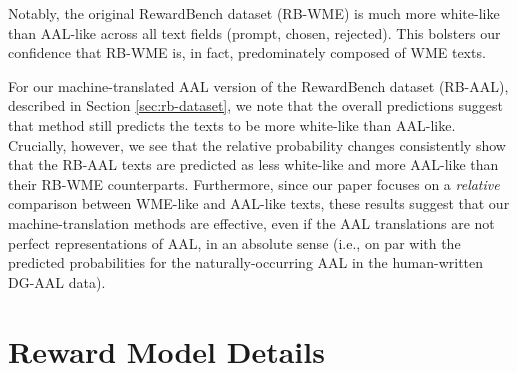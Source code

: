 Notably, the original RewardBench dataset (\textsc{RB-WME}) is much more white-like than AAL-like across all text fields (prompt, chosen, rejected). This bolsters our confidence that \textsc{RB-WME} is, in fact, predominately composed of WME texts.

For our machine-translated AAL version of the RewardBench dataset (\textsc{RB-AAL}), described in Section \ref{sec:rb-dataset}, we note that the overall predictions suggest that  method still predicts the texts to be more white-like than AAL-like. Crucially, however, we see that the relative probability changes consistently show that the \textsc{RB-AAL} texts are predicted as less white-like and more AAL-like than their \textsc{RB-WME} counterparts. Furthermore, since our paper focuses on a \textit{relative} comparison between WME-like and AAL-like texts, these results suggest that our machine-translation methods are effective, even if the AAL translations are not perfect representations of AAL, in an absolute sense (i.e., on par with the predicted probabilities for the naturally-occurring AAL in the human-written \textsc{DG-AAL} data).


\section{Reward Model Details}
\label{app:reward-model-details}

